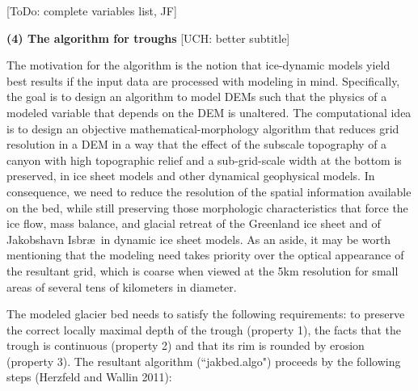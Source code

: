 \documentclass[11pt]{article}
\begin{document}
[ToDo: complete variables list, JF]
 
 \vb
 \bs
 {\bf (4) The algorithm for troughs} [UCH: better subtitle]
 
 The motivation for the algorithm is the notion that ice-dynamic models yield best results if the input data are processed with modeling in mind. Specifically, the goal is to design an algorithm to model DEMs such that the physics of a modeled variable that depends on the DEM is unaltered. 
 The computational idea  is to design an objective mathematical-morphology algorithm that reduces grid resolution in a DEM  in a way that the effect of the subscale topography  of a canyon with high topographic relief and  a sub-grid-scale width at the bottom is preserved,
in ice sheet models and other dynamical geophysical models.
In consequence, we need to 
reduce the resolution of the spatial information available on the bed, while still preserving those morphologic characteristics that force the ice flow, mass balance, and glacial retreat of the Greenland ice sheet
and of Jakobshavn Isbr\ae\  in dynamic ice sheet models. As an aside, it may be worth mentioning that the 
modeling need takes priority over the optical appearance of the resultant grid, which is coarse when
viewed at the 5km resolution for small areas of several tens of kilometers in diameter.

The modeled glacier bed needs to satisfy the following requirements: to preserve the correct locally maximal depth of the trough (property 1), the facts that the trough is continuous (property 2) and that its rim is rounded by erosion (property 3).
The resultant algorithm (``jakbed.algo") proceeds by the following steps (Herzfeld and Wallin 2011):
\end{document}
